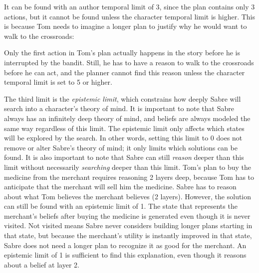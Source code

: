 \documentclass{nilreport}
\begin{document}
\medskip{}

\noindent It can be found with an author temporal limit of 3, since
the plan contains only 3 actions, but it cannot be found unless the
character temporal limit is higher. This is because Tom needs to imagine
a longer plan to justify why he would want to walk to the crossroads:

\medskip{}

\noindent{}

\medskip{}

\noindent Only the first action in Tom's plan actually happens in
the story before he is interrupted by the bandit. Still, he has to
have a reason to walk to the crossroads before he can act, and the
planner cannot find this reason unless the character temporal limit
is set to 5 or higher.

The third limit is the \emph{epistemic limit}, which constrains how
deeply Sabre will search into a character's theory of mind. It is
important to note that Sabre always has an infinitely deep theory
of mind, and beliefs are always modeled the same way regardless of
this limit. The epistemic limit only affects which states will be
explored by the search. In other words, setting this limit to 0 does
not remove or alter Sabre's theory of mind; it only limits which solutions
can be found. It is also important to note that Sabre can still \emph{reason}
deeper than this limit without necessarily \emph{searching} deeper
than this limit. Tom's plan to buy the medicine from the merchant
requires reasoning 2 layers deep, because Tom has to anticipate that
the merchant will sell him the medicine. Sabre has to reason about
what Tom believes the merchant believes (2 layers). However, the solution
can still be found with an epistemic limit of 1. The state that represents
the merchant's beliefs after buying the medicine is generated even
though it is never visited. Not visited means Sabre never considers
building longer plans starting in that state, but because the merchant's
utility is instantly improved in that state, Sabre does not need a
longer plan to recognize it as good for the merchant. An epistemic
limit of 1 is sufficient to find this explanation, even though it
reasons about a belief at layer 2.
\end{document}
